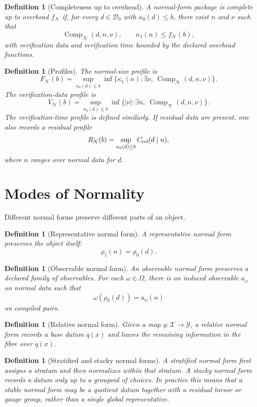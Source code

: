 \documentclass[11pt]{article}
\newtheorem{definition}[theorem]{Definition}
\DeclareMathOperator{\Comp}{Comp}
\begin{document}
\begin{definition}[Completeness up to overhead]
A normal-form package is complete up to overhead \(f_{\mathcal N}\) if, for every \(d\in\mathcal D_0\) with \(\kappa_0(d)\leq b\), there exist \(n\) and \(\nu\) such that
\[
\Comp_{\mathcal N}(d,n,\nu),
\qquad
\kappa_1(n)\leq f_{\mathcal N}(b),
\]
with verification data and verification time bounded by the declared overhead functions.
\end{definition}

\begin{definition}[Profiles]
The normal-size profile is
\[
F_{\mathcal N}(b)
=
\sup_{\kappa_0(d)\leq b}
\inf\{\kappa_1(n):\exists \nu,\ \Comp_{\mathcal N}(d,n,\nu)\}.
\]
The verification-data profile is
\[
V_{\mathcal N}(b)
=
\sup_{\kappa_0(d)\leq b}
\inf\{|\nu|:\exists n,\ \Comp_{\mathcal N}(d,n,\nu)\}.
\]
The verification-time profile is defined similarly. If residual data are present, one also records a residual profile
\[
R_{\mathcal N}(b)=
\sup_{\kappa_0(d)\leq b} C_{\rm rel}(d\mid n),
\]
where \(n\) ranges over normal data for \(d\).
\end{definition}

\section{Modes of Normality}

Different normal forms preserve different parts of an object.

\begin{definition}[Representative normal form]
A representative normal form preserves the object itself:
\[
\rho_1(n)=\rho_0(d).
\]
\end{definition}

\begin{definition}[Observable normal form]
An observable normal form preserves a declared family of observables. For each \(\omega\in\Omega\), there is an induced observable \(a_\omega\) on normal data such that
\[
\omega(\rho_0(d))=a_\omega(n)
\]
on compiled pairs.
\end{definition}

\begin{definition}[Relative normal form]
Given a map \(q:\mathcal X\to\mathcal Y\), a relative normal form records a base datum \(q(x)\) and leaves the remaining information in the fibre over \(q(x)\).
\end{definition}

\begin{definition}[Stratified and stacky normal forms]
A stratified normal form first assigns a stratum and then normalizes within that stratum. A stacky normal form records a datum only up to a groupoid of choices. In practice this means that a stable normal form may be a quotient datum together with a residual torsor or gauge group, rather than a single global representative.
\end{definition}
\end{document}

